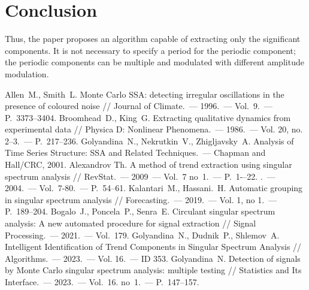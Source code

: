 \documentclass[12pt]{article}
\begin{document}
\section{Conclusion}
Thus, the paper proposes an algorithm capable of extracting only the significant components. It is not necessary to specify a period for the periodic component; the periodic components can be multiple and modulated with different amplitude modulation.


\begin{thebibliography}{10}

     Allen~M., Smith~L. Monte Carlo SSA: detecting irregular oscillations in the presence of coloured noise // Journal of Climate.~--- 1996.~--- Vol.~9.~--- P.~3373--3404.
     Broomhead~D., King~G. Extracting qualitative dynamics from experimental data // Physica D: Nonlinear Phenomena.~--- 1986.~--- Vol. 20, no. 2–3.~--- P.~217--236.
     Golyandina~N., Nekrutkin~V., Zhigljavsky~A. Analysis of Time Series Structure: SSA and Related Techniques.~--- Chapman and Hall/CRC, 2001.
     Alexandrov Th. A method of trend extraction using singular spectrum analysis // RevStat.~--- 2009~--- Vol.~7 no~1.~--- P.~1-–22.
    .~--- 2004.~--- Vol.~7-80.~--- P.~54--61.
     Kalantari~M., Hassani.~H. Automatic grouping in singular spectrum analysis // Forecasting.~--- 2019.~--- Vol. 1, no 1.~--- P.~189--204.
     Bogalo~J., Poncela~P., Senra~E. Circulant singular spectrum analysis: A new automated procedure for signal extraction // Signal Processing.~--- 2021.~--- Vol.~179.
     Golyandina~N., Dudnik~P., Shlemov~A. Intelligent Identification of Trend Components in Singular Spectrum Analysis // Algorithms.~--- 2023.~--- Vol. 16.~--- ID 353.
     Golyandina~N. Detection of signals by Monte Carlo singular spectrum analysis: multiple testing // Statistics and Its Interface.~--- 2023.~--- Vol.~16. no~1.~--- P.~147--157.

\end{thebibliography}
\end{document}
